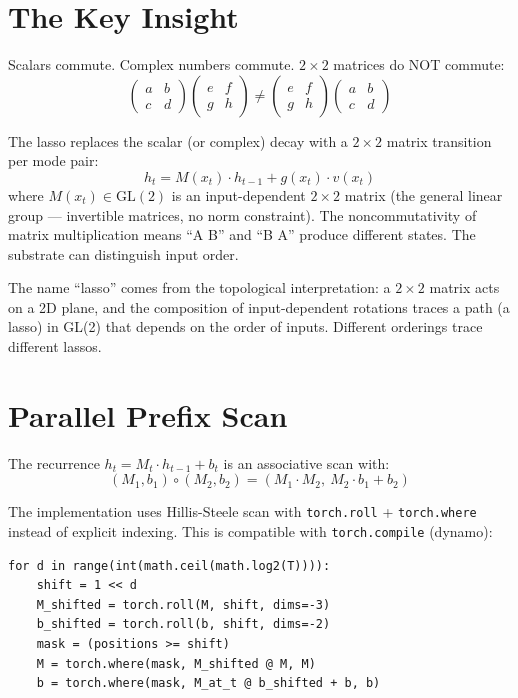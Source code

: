\documentclass[11pt,a4paper]{report}
\begin{document}
\section{The Key Insight}

Scalars commute. Complex numbers commute. $2 \times 2$ matrices do NOT commute:
\[
\begin{pmatrix} a & b \\ c & d \end{pmatrix} \begin{pmatrix} e & f \\ g & h \end{pmatrix}
\neq
\begin{pmatrix} e & f \\ g & h \end{pmatrix} \begin{pmatrix} a & b \\ c & d \end{pmatrix}
\]

The lasso replaces the scalar (or complex) decay with a $2 \times 2$ matrix transition per mode pair:
\[
h_t = M(x_t) \cdot h_{t-1} + g(x_t) \cdot v(x_t)
\]
where $M(x_t) \in \text{GL}(2)$ is an input-dependent $2 \times 2$ matrix (the general linear group --- invertible matrices, no norm constraint). The noncommutativity of matrix multiplication means ``A B'' and ``B A'' produce different states. The substrate can distinguish input order.

The name ``lasso'' comes from the topological interpretation: a $2 \times 2$ matrix acts on a 2D plane, and the composition of input-dependent rotations traces a path (a lasso) in GL(2) that depends on the order of inputs. Different orderings trace different lassos.

\section{Parallel Prefix Scan}

The recurrence $h_t = M_t \cdot h_{t-1} + b_t$ is an associative scan with:
\[
(M_1, b_1) \circ (M_2, b_2) = (M_1 \cdot M_2,\ M_2 \cdot b_1 + b_2)
\]

The implementation uses Hillis-Steele scan with \texttt{torch.roll} + \texttt{torch.where} instead of explicit indexing. This is compatible with \texttt{torch.compile} (dynamo):

\begin{verbatim}
for d in range(int(math.ceil(math.log2(T)))):
    shift = 1 << d
    M_shifted = torch.roll(M, shift, dims=-3)
    b_shifted = torch.roll(b, shift, dims=-2)
    mask = (positions >= shift)
    M = torch.where(mask, M_shifted @ M, M)
    b = torch.where(mask, M_at_t @ b_shifted + b, b)
\end{verbatim}
\end{document}
